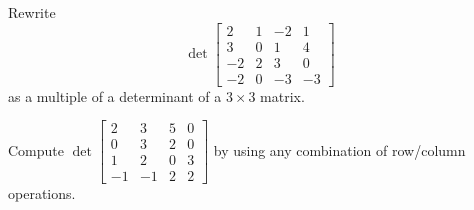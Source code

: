 \begin{activity}{10}
Rewrite \[\det \begin{bmatrix} 2 & 1 & -2 & 1 \\ 3 & 0 & 1 & 4 \\ -2 & 2 & 3 & 0 \\ -2 & 0 & -3 & -3 \end{bmatrix} \] as a multiple of a determinant of a \(3\times3\) matrix.
\end{activity}


\begin{activity}{20}
  Compute 
  \(
    \det\begin{bmatrix} 
      2 & 3 & 5 & 0 \\ 
      0 & 3 & 2 & 0 \\ 
      1 & 2 & 0 & 3 \\ 
      -1 & -1 & 2 & 2 
    \end{bmatrix}
  \) by using any combination of row/column operations.
\end{activity}

